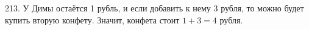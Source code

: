 213. У Димы остаётся 1 рубль, и если добавить к нему 3 рубля, то можно будет купить вторую конфету. Значит, конфета стоит $1+3=4$ рубля.\\

